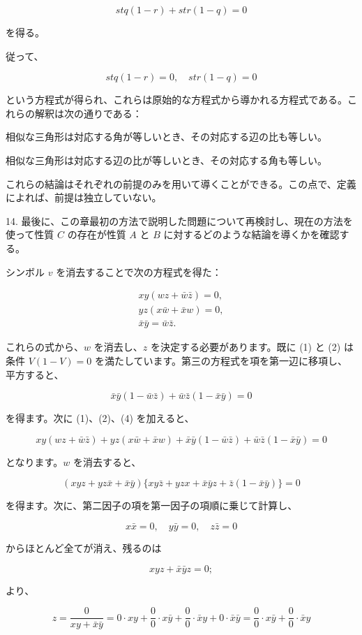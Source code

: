 \documentclass[a4paper,11pt,openany]{ltjsbook}
\begin{document}
\[
stq(1 - r) + str(1 - q) = 0
\]

を得る。

従って、

\[
stq (1 - r) = 0, \quad str (1 - q) = 0
\]

という方程式が得られ、これらは原始的な方程式から導かれる方程式である。これらの解釈は次の通りである：

相似な三角形は対応する角が等しいとき、その対応する辺の比も等しい。

相似な三角形は対応する辺の比が等しいとき、その対応する角も等しい。

これらの結論はそれぞれの前提のみを用いて導くことができる。この点で、定義によれば、前提は独立していない。

14. 最後に、この章最初の方法で説明した問題について再検討し、現在の方法を使って性質 $C$ の存在が性質 $A$ と $B$ に対するどのような結論を導くかを確認する。

シンボル $v$ を消去することで次の方程式を得た：

\begin{eqnarray}
xy(wz + \bar{w}\bar{z}) = 0, \\
yz (x\bar{w} + \bar{x}w) = 0,\\
\bar{x}\bar{y} = \bar{w}\bar{z}.
\end{eqnarray}

これらの式から、$w$ を消去し、$z$ を決定する必要があります。既に (1) と (2) は条件 $V(1 - V) = 0$ を満たしています。第三の方程式を項を第一辺に移項し、平方すると、

\[
\bar{x}\bar{y}(1 - \bar{w}\bar{z}) + \bar{w}\bar{z}(1 - \bar{x}\bar{y}) = 0
\]

を得ます。次に (1)、(2)、(4) を加えると、

\[
xy(wz + \bar{w}\bar{z}) + yz(x\bar{w} + \bar{x}w) + \bar{x}\bar{y}(1 - \bar{w}\bar{z}) + \bar{w}\bar{z}(1 - \bar{x}\bar{y}) = 0
\]

となります。$w$ を消去すると、

\[
(xyz + yz\bar{x} + \bar{x}\bar{y}) \{xy\bar{z} + yzx + \bar{x}\bar{y}z + \bar{z}(1 - \bar{x}\bar{y})\} = 0
\]

を得ます。次に、第二因子の項を第一因子の項順に乗じて計算し、

\[
x\bar{x} = 0, \quad y\bar{y} = 0, \quad z\bar{z} = 0
\]

からほとんど全てが消え、残るのは

\[
xyz + \bar{x}\bar{y}z = 0;
\]

より、

\[
z = \frac{0}{xy + \bar{x}\bar{y}}
= 0 \cdot xy + \frac{0}{0} \cdot x\bar{y} + \frac{0}{0} \cdot \bar{x}y + 0 \cdot \bar{x}\bar{y}
= \frac{0}{0} \cdot x\bar{y} + \frac{0}{0} \cdot \bar{x}y
\]
\end{document}
